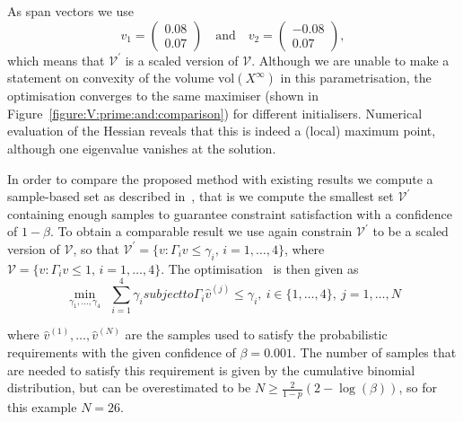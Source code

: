 \documentclass{ifacconf}
\providecommand{\vol}{\text{vol}}
\providecommand{\V}{\mathcal V}
\providecommand{\bfa}[1]{\mathbf{#1}}
\begin{document}
%
As span vectors we use 
\[
v_1 = \begin{pmatrix} 0.08 \\ 0.07\end{pmatrix} \quad \text{and}\quad 
v_2 = \begin{pmatrix}-0.08 \\ 0.07\end{pmatrix},
\] 
which means that $\V^\prime$ is a scaled version of $\V$.
%
Although we are unable to make a statement on convexity of the volume $\vol(X^\infty)$ in this parametrisation, the optimisation converges to the same maximiser (shown in Figure~\ref {figure:V:prime:and:comparison}) for different initialisers. Numerical evaluation of the Hessian reveals that this is indeed a (local) maximum point, although one eigenvalue vanishes at the solution.
%

In order to compare the proposed method with existing results we compute a sample-based set as described in~\cite{Zhang2015}, that is we compute the smallest set $\V^\prime$ containing enough samples to guarantee constraint satisfaction with a confidence of $1-\beta$.
%
To obtain a comparable result we use again constrain $\V^\prime $ to be a scaled version of $\V$, so that $\V^\prime = \{v : \Gamma_i v \leq \gamma_i, \, i =1,\ldots,4\}$, where $\V = \{v : \Gamma_i v \leq 1, \, i =1, \ldots ,4\}$.
%
The optimisation~\citep[eq.~(10)]{Zhang2015} is then given as
%
\begin{subequations}\label{eq:comparison:set}
\begin{equation}\min_{\gamma_1,\dots,\gamma_4} \  \ \sum_{i=1}^4\gamma_i
\end{equation}
subject to 
\begin{equation}
\Gamma_i \hat{v}^{(j)}\leq \gamma_i ,\ i\in\{1,\ldots,4\}, \ j = 1,\ldots,N
\end{equation}
\end{subequations}
%

where $\hat{v}^{(1)},\ldots,\hat{v}^{(N)}$ are the samples used to satisfy the probabilistic requirements with the given confidence of $\beta=0.001$. 
%
The number of samples that are needed to satisfy this requirement is given by the cumulative binomial distribution, but can be overestimated to be $N \geq \frac{2}{1-p}(2-\log(\beta))$, so for this example $N = 26$.
%
\end{document}
